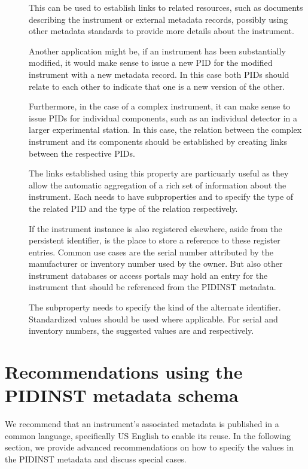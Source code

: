 \documentclass[a4paper,10pt,english]{sphinxmanual}
\begin{document}
\begin{description}
\item[{}] \leavevmode
This can be used to establish links to related resources, such as
documents describing the instrument or external metadata records,
possibly using other metadata standards to provide more details
about the instrument.

Another application might be, if an instrument has been
substantially modified, it would make sense to issue a new PID for
the modified instrument with a new metadata record.  In this case
both PIDs should relate to each other to indicate that one is a new
version of the other.

Furthermore, in the case of a complex instrument, it can make sense
to issue PIDs for individual components, such as an individual
detector in a larger experimental station.  In this case, the
relation between the complex instrument and its components should be
established by creating links between the respective PIDs.

The links established using this property are particuarly useful as
they allow the automatic aggregation of a rich set of information
about the instrument.  Each  needs to have
subproperties  and  to specify
the type of the related PID and the type of the relation
respectively.

\item[{}] \leavevmode
If the instrument instance is also registered elsewhere, aside from
the persistent identifier,  is the place to
store a reference to these register entries.  Common use cases are
the serial number attributed by the manufacturer or inventory number
used by the owner.  But also other instrument databases or access
portals may hold an entry for the instrument that should be
referenced from the PIDINST metadata.

The subproperty  needs to specify the kind
of the alternate identifier.  Standardized values should be used
where applicable.  For serial and inventory numbers, the suggested
values are  and  respectively.

\end{description}


\section{Recommendations using the PIDINST metadata schema}
\label{\detokenize{white-paper/metadata-schema-recommendations:recommendations-using-the-pidinst-metadata-schema}}\label{\detokenize{white-paper/metadata-schema-recommendations:pidinst-metadata-schema-recommendations}}\label{\detokenize{white-paper/metadata-schema-recommendations::doc}}
We recommend that an instrument’s associated metadata is published in a common language,
specifically US English to enable its reuse.  In the following section, we provide
advanced recommendations on how to specify the values in the PIDINST
metadata and discuss special cases.
\end{document}
